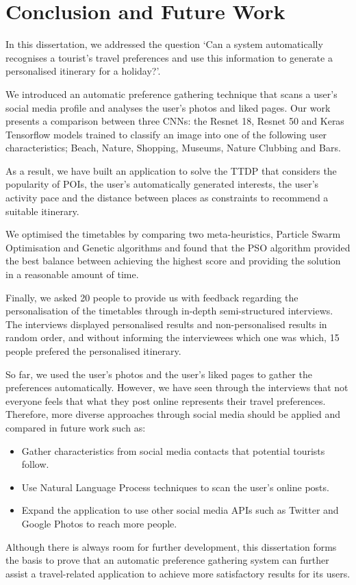 \section{Conclusion and Future Work}

In this dissertation, we addressed the question `Can a system automatically
recognises a tourist's travel preferences and use this information to generate
a personalised itinerary for a holiday?'. 

We introduced an automatic preference gathering technique that scans a user's
social media profile and analyses the user's photos and liked pages. Our work
presents a comparison between three CNNs: the Resnet 18, Resnet 50 and Keras
Tensorflow models trained to classify an image into one of the following user
characteristics; Beach, Nature, Shopping, Museums, Nature Clubbing and Bars.

As a result, we have built an application to solve the TTDP that considers the
popularity of POIs, the user's automatically generated interests, the user's
activity pace and the distance between places as constraints to recommend a
suitable itinerary.

We optimised the timetables by comparing two meta-heuristics, Particle Swarm
Optimisation and Genetic algorithms and found that the PSO algorithm provided
the best balance between achieving the highest score and providing the solution
in a reasonable amount of time. 

Finally, we asked 20 people to provide us with feedback regarding the
personalisation of the timetables through in-depth semi-structured interviews.
The interviews displayed personalised results and non-personalised results in
random order, and without informing the interviewees which one was which, 15
people prefered the personalised itinerary.

So far, we used the user's photos and the user's liked pages to gather the
preferences automatically. However, we have seen through the interviews that not
everyone feels that what they post online represents their travel preferences.
Therefore, more diverse approaches through social media should be applied and
compared in future work such as:

\begin{itemize}
\item Gather characteristics from social media contacts that potential tourists follow.
\item Use Natural Language Process techniques to scan the user's online posts.
\item Expand the application to use other social media APIs such as Twitter and Google Photos to reach more people. 
\end{itemize}

Although there is always room for further development, this dissertation forms
the basis to prove that an automatic preference gathering system can further
assist a travel-related application to achieve more satisfactory results for
its users.

